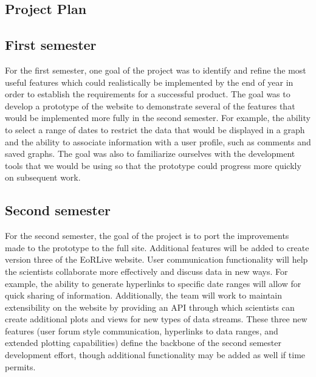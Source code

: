 \documentclass[12pt]{article}
\begin{document}
\begin{spacing}{1.5}
\section{Project Plan}
\subsection{First semester}
For the first semester, one goal of the project was to identify and refine the most useful features which could realistically be implemented by the end of year in order to establish the requirements for a successful product. The goal was to develop a prototype of the website to demonstrate several of the features that would be implemented more fully in the second semester. For example, the ability to select a range of dates to restrict the data that would be displayed in a graph and the ability to associate information with a user profile, such as comments and saved graphs. The goal was also to familiarize ourselves with the development tools that we would be using so that the prototype could progress more quickly on subsequent work.
\subsection{Second semester}
For the second semester, the goal of the project is to port the improvements made to the prototype to the full site. Additional features will be added to create version three of the EoRLive website. User communication functionality will help the scientists collaborate more effectively and discuss data in new ways. For example, the ability to generate hyperlinks to specific date ranges will allow for quick sharing of information. Additionally, the team will work to maintain extensibility on the website by providing an API through which scientists can create additional plots and views for new types of data streams. These three new features (user forum style communication, hyperlinks to data ranges, and extended plotting capabilities) define the backbone of the second semester development effort, though additional functionality may be added as well if time permits.


\end{spacing}
\end{document}
